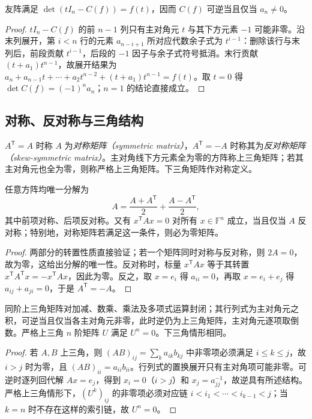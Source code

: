 \begin{proposition}
\label{prop:matrix-companion}
友阵满足 $\det(tI_n-C(f))=f(t)$，因而 $C(f)$ 可逆当且仅当 $a_n\ne0$。
\end{proposition}
\begin{proof}
$tI_n-C(f)$ 的前 $n-1$ 列只有主对角元 $t$ 与其下方元素 $-1$ 可能非零。沿末列展开，第 $i<n$ 行的元素 $a_{n-i+1}$ 所对应代数余子式为 $t^{i-1}$：删除该行与末列后，前段贡献 $t^{i-1}$，后段的 $-1$ 因子与余子式符号抵消。末行贡献 $(t+a_1)t^{n-1}$，故展开结果为 $a_n+a_{n-1}t+\cdots+a_2t^{n-2}+(t+a_1)t^{n-1}=f(t)$。取 $t=0$ 得 $\det C(f)=(-1)^na_n$；$n=1$ 的结论直接成立。
\end{proof}

\subsection{对称、反对称与三角结构}

\begin{definition}
$A^{\mathsf T}=A$ 时称 $A$ 为\emph{对称矩阵（symmetric matrix）}，$A^{\mathsf T}=-A$ 时称其为\emph{反对称矩阵（skew-symmetric matrix）}。主对角线下方元素全为零的方阵称上三角矩阵；若其主对角元也全为零，则称严格上三角矩阵。下三角矩阵作对称定义。
\end{definition}

\begin{proposition}
\label{prop:matrix-symmetric-test}
任意方阵均唯一分解为
\begin{equation}
 A=\frac{A+A^{\mathsf T}}2+\frac{A-A^{\mathsf T}}2,
 \label{eq:matrix-symmetric-split}
\end{equation}
其中前项对称、后项反对称。又有 $x^{\mathsf T}Ax=0$ 对所有 $x\in\mathbb F^n$ 成立，当且仅当 $A$ 反对称；特别地，对称矩阵若满足这一条件，则必为零矩阵。
\end{proposition}
\begin{proof}
两部分的转置性质直接验证；若一个矩阵同时对称与反对称，则 $2A=0$，故为零，这给出分解的唯一性。反对称时，标量 $x^{\mathsf T}Ax$ 等于其转置 $x^{\mathsf T}A^{\mathsf T}x=-x^{\mathsf T}Ax$，因此为零。反之，取 $x=e_i$ 得 $a_{ii}=0$，再取 $x=e_i+e_j$ 得 $a_{ij}+a_{ji}=0$，于是 $A^{\mathsf T}=-A$。
\end{proof}

\begin{proposition}
\label{prop:matrix-triangular}
同阶上三角矩阵对加减、数乘、乘法及多项式运算封闭；其行列式为主对角元之积，可逆当且仅当各主对角元非零，此时逆仍为上三角矩阵，主对角元逐项取倒数。严格上三角 $n$ 阶矩阵 $U$ 满足 $U^n=0$。下三角情形相同。
\end{proposition}
\begin{proof}
若 $A,B$ 上三角，则 $(AB)_{ij}=\sum_k a_{ik}b_{kj}$ 中非零项必须满足 $i\le k\le j$，故 $i>j$ 时为零，且 $(AB)_{ii}=a_{ii}b_{ii}$。行列式的置换展开只有主对角项可能非零。可逆时逐列回代解 $Ax=e_j$，得到 $x_i=0$（$i>j$）和 $x_j=a_{jj}^{-1}$，故逆具有所述结构。严格上三角情形下，$(U^k)_{ij}$ 的非零项必须对应链 $i<i_1<\cdots<i_{k-1}<j$；当 $k=n$ 时不存在这样的索引链，故 $U^n=0$。
\end{proof}

